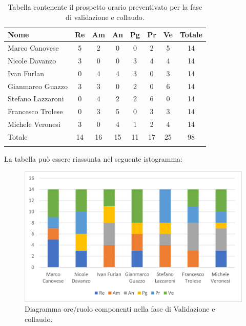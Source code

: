 \begin{longtable}{|l|c|c|c|c|c|c|c|}
	\hline
	\rowcolor{lighter-grayer}
	\textbf{Nome}     & \textbf{Re} & \textbf{Am} & \textbf{An} & \textbf{Pg} & \textbf{Pr} & \textbf{Ve} & \textbf{Totale} \\
	\hline
	\endfirsthead

	\hline
	Marco Canovese    & 5           & 2           & 0           & 0           & 2           & 5           & 14              \\
	\hline
	\hline
	Nicole Davanzo    & 3           & 0           & 0           & 3           & 4           & 4           & 14              \\
	\hline
	\hline
	Ivan Furlan       & 0           & 4           & 4           & 3           & 0           & 3           & 14              \\
	\hline
	\hline
	Gianmarco Guazzo  & 3           & 3           & 0           & 2           & 0           & 6           & 14              \\
	\hline
	\hline
	Stefano Lazzaroni & 0           & 4           & 2           & 2           & 6           & 0           & 14              \\
	\hline
	\hline
	Francesco Trolese & 0           & 3           & 5           & 0           & 3           & 3           & 14              \\
	\hline
	\hline
	Michele Veronesi  & 3           & 0           & 4           & 1           & 2           & 4           & 14              \\
	\hline
	\hline
	Totale            & 14          & 16          & 15          & 11          & 17          & 25          & 98              \\
	\hline
	\rowcolor{white}
	\caption{Tabella contenente il prospetto orario preventivato per la fase di validazione e collaudo.}
\end{longtable}


La tabella può essere riassunta nel seguente istogramma:

\begin{figure}[H]
	\centering
	\includegraphics[width=0.8\linewidth]{res/images/preventivo/7-1.png}
	\caption{Diagramma ore/ruolo componenti nella fase di Validazione e collaudo.}
	\label{fig:diagramma suddivisione ruoli fase Validazione e collaudo.}
\end{figure}

